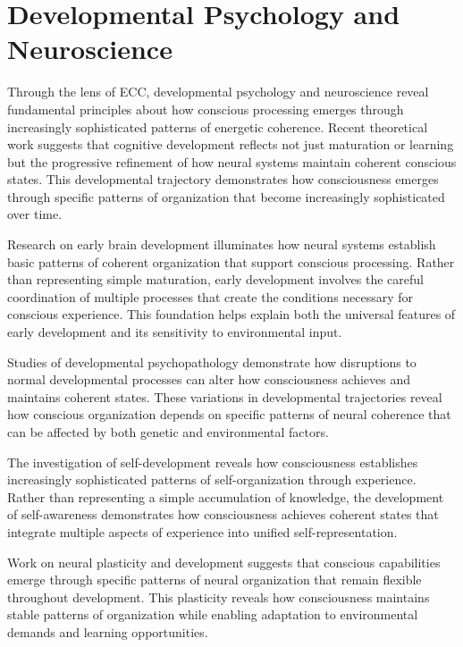 \section{Developmental Psychology and Neuroscience}

Through the lens of ECC, developmental psychology and neuroscience reveal fundamental principles about how conscious processing emerges through increasingly sophisticated patterns of energetic coherence. Recent theoretical work \cite{Bjorklund2014} suggests that cognitive development reflects not just maturation or learning but the progressive refinement of how neural systems maintain coherent conscious states. This developmental trajectory demonstrates how consciousness emerges through specific patterns of organization that become increasingly sophisticated over time.

Research on early brain development \cite{DehaeneLambertz2015} illuminates how neural systems establish basic patterns of coherent organization that support conscious processing. Rather than representing simple maturation, early development involves the careful coordination of multiple processes that create the conditions necessary for conscious experience. This foundation helps explain both the universal features of early development and its sensitivity to environmental input.

Studies of developmental psychopathology \cite{Cicchetti2016} demonstrate how disruptions to normal developmental processes can alter how consciousness achieves and maintains coherent states. These variations in developmental trajectories reveal how conscious organization depends on specific patterns of neural coherence that can be affected by both genetic and environmental factors.

The investigation of self-development \cite{Damasio2010} reveals how consciousness establishes increasingly sophisticated patterns of self-organization through experience. Rather than representing a simple accumulation of knowledge, the development of self-awareness demonstrates how consciousness achieves coherent states that integrate multiple aspects of experience into unified self-representation.

Work on neural plasticity and development \cite{Nelson2021} suggests that conscious capabilities emerge through specific patterns of neural organization that remain flexible throughout development. This plasticity reveals how consciousness maintains stable patterns of organization while enabling adaptation to environmental demands and learning opportunities.

